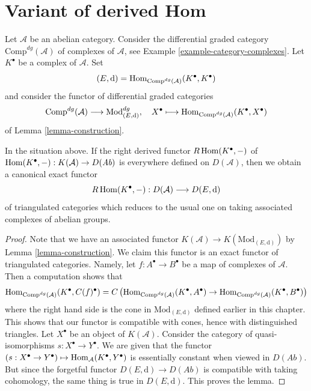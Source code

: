 \section{Variant of derived Hom}
\label{section-variant}

\noindent
Let $\mathcal{A}$ be an abelian category. Consider the differential graded
category $\text{Comp}^{dg}(\mathcal{A})$ of complexes of $\mathcal{A}$, see
Example \ref{example-category-complexes}.
Let $K^\bullet$ be a complex of $\mathcal{A}$. Set
$$
(E, \text{d}) = \mathop{\mathrm{Hom}}\nolimits_{\text{Comp}^{dg}(\mathcal{A})}(K^\bullet, K^\bullet)
$$
and consider the functor of differential graded categories
$$
\text{Comp}^{dg}(\mathcal{A}) \longrightarrow \text{Mod}^{dg}_{(E, \text{d})},
\quad
X^\bullet
\longmapsto
\mathop{\mathrm{Hom}}\nolimits_{\text{Comp}^{dg}(\mathcal{A})}(K^\bullet, X^\bullet)
$$
of Lemma \ref{lemma-construction}.

\begin{lemma}
\label{lemma-existence-of-derived}
In the situation above. If the right derived functor $R\mathop{\mathrm{Hom}}\nolimits(K^\bullet, -)$
of $\mathop{\mathrm{Hom}}\nolimits(K^\bullet, -) : K(\mathcal{A}) \to D(\textit{Ab})$
is everywhere defined on $D(\mathcal{A})$, then we obtain a canonical exact
functor
$$
R\mathop{\mathrm{Hom}}\nolimits(K^\bullet, -) : D(\mathcal{A}) \longrightarrow D(E, \text{d})
$$
of triangulated categories which reduces to the usual one  on taking
associated complexes of abelian groups.
\end{lemma}

\begin{proof}
Note that we have an associated functor
$K(\mathcal{A}) \to K(\text{Mod}_{(E, \text{d})})$ by
Lemma \ref{lemma-construction}.
We claim this functor is an exact functor of triangulated categories.
Namely, let $f : A^\bullet \to B^\bullet$ be a map of complexes
of $\mathcal{A}$. Then a computation shows that
$$
\mathop{\mathrm{Hom}}\nolimits_{\text{Comp}^{dg}(\mathcal{A})}(K^\bullet, C(f)^\bullet)
=
C\left(
\mathop{\mathrm{Hom}}\nolimits_{\text{Comp}^{dg}(\mathcal{A})}(K^\bullet, A^\bullet) \to
\mathop{\mathrm{Hom}}\nolimits_{\text{Comp}^{dg}(\mathcal{A})}(K^\bullet, B^\bullet)
\right)
$$
where the right hand side is the cone in $\text{Mod}_{(E, \text{d})}$
defined earlier in this chapter.
This shows that our functor is compatible with cones, hence with
distinguished triangles. Let $X^\bullet$ be an object of $K(\mathcal{A})$.
Consider the category of quasi-isomorphisms $s : X^\bullet \to Y^\bullet$.
We are given that the functor
$(s : X^\bullet \to Y^\bullet) \mapsto \mathop{\mathrm{Hom}}\nolimits_\mathcal{A}(K^\bullet, Y^\bullet)$
is essentially constant when viewed in $D(\textit{Ab})$.
But since the forgetful functor $D(E, \text{d}) \to D(\textit{Ab})$
is compatible with taking cohomology, the same thing is true in
$D(E, \text{d})$. This proves the lemma.
\end{proof}

